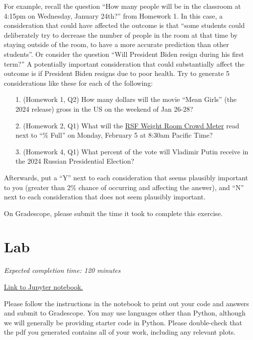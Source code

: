 \documentclass[11pt]{article}
\begin{document}
For example, recall the question ``How many people will be in the classroom at 4:15pm on Wednesday, January 24th?'' from Homework 1. In this case, a consideration that could have affected the outcome is that ``some students could deliberately try to decrease the number of people in the room at that time by staying outside of the room, to have a more accurate prediction than other students''. Or consider the question ``Will President Biden resign during his first term?'' A potentially important consideration that could substantially affect the outcome is if President Biden resigns due to poor health. Try to generate 5 considerations like these for each of the following:

\begin{enumerate}
	\item[1.] (Homework 1, Q2) How many dollars will the movie ``Mean Girls'' (the 2024 release) gross in the US on the weekend of Jan 26-28?

	\item[2.] (Homework 2, Q1) What will the \href{https://recwell.berkeley.edu/rsf-weight-room-crowd-meter/}{RSF Weight Room Crowd Meter} read next to ``\% Full'' on Monday, February 5 at 8:30am Pacific Time?

	\item[3.] (Homework 4, Q1) What percent of the vote will Vladimir Putin receive in the 2024 Russian Presidential Election?



\end{enumerate}

Afterwards, put a ``Y'' next to each consideration that seems plausibly important to you (greater than 2\% chance of occurring and affecting the answer), 
and ``N'' next to each consideration that does not seem plausibly important.

On Gradescope, please submit the time it took to complete this exercise.

\section*{Lab}

\emph{Expected completion time: 120 minutes}

\href{https://datahub.berkeley.edu/hub/user-redirect/git-pull?repo=https%3A%2F%2Fgithub.com%2Frsha256%2Fforecasting-class-sp24&branch=main&urlpath=tree%2Fforecasting-class-sp24%2Fhw%2Fhw4%2Fhw4lab.ipynb}{Link to Jupyter notebook.}

Please follow the instructions in the notebook to print out your code and answers and submit to Gradescope. You may use languages other than Python, although we will generally be providing starter code in Python. Please double-check that the pdf you generated contains all of your work, including any relevant plots.
\end{document}
